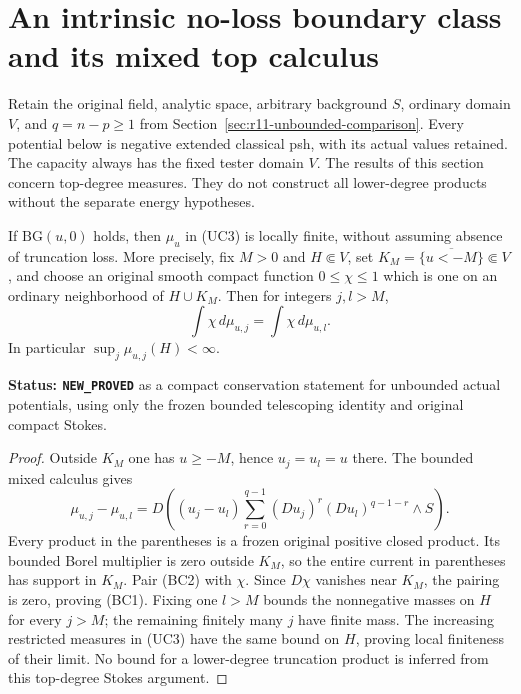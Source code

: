 \section{An intrinsic no-loss boundary class and its mixed top calculus}
\label{sec:r11-capacity-tail-boundary-class}

Retain the original field, analytic space, arbitrary background $S$,
ordinary domain $V$, and $q=n-p\geq1$ from
Section~\ref{sec:r11-unbounded-comparison}. Every potential below is
negative extended classical psh, with its actual values retained.
The capacity always has the fixed tester domain $V$. The results
of this section concern top-degree measures. They do not construct
all lower-degree products without the separate energy hypotheses.

\begin{lemma}
\label{lem:r11-compact-truncation-conservation}
If $\mathrm{BG}(u,0)$ holds, then $\mu_u$ in (UC3) is locally
finite, without assuming absence of truncation loss. More precisely,
fix $M>0$ and $H\Subset V$, set
$K_M=\overline{\{u<-M\}}\Subset V$, and choose an original smooth
compact function $0\leq\chi\leq1$ which is one on an ordinary
neighborhood of $H\cup K_M$. Then for integers $j,l>M$,
\[
                       \int\chi\,d\mu_{u,j}
                           =\int\chi\,d\mu_{u,l}.
 \tag{BC1}
\]
In particular $\sup_j\mu_{u,j}(H)<\infty$.
\end{lemma}

\noindent\textbf{Status: \texttt{NEW\_PROVED}} as a compact
conservation statement for unbounded actual potentials, using only
the frozen bounded telescoping identity and original compact Stokes.

\begin{proof}
Outside $K_M$ one has $u\geq-M$, hence $u_j=u_l=u$ there.
The bounded mixed calculus gives
\[
 \mu_{u,j}-\mu_{u,l}
   =D\left((u_j-u_l)
       \sum_{r=0}^{q-1}(Du_j)^r(Du_l)^{q-1-r}\wedge S\right).
 \tag{BC2}
\]
Every product in the parentheses is a frozen original positive
closed product. Its bounded Borel multiplier is zero outside
$K_M$, so the entire current in parentheses has support in $K_M$.
Pair (BC2) with $\chi$. Since $D\chi$ vanishes near $K_M$,
the pairing is zero, proving (BC1). Fixing one $l>M$ bounds
the nonnegative masses on $H$ for every $j>M$; the remaining
finitely many $j$ have finite mass. The increasing restricted
measures in (UC3) have the same bound on $H$, proving local
finiteness of their limit. No bound for a lower-degree truncation
product is inferred from this top-degree Stokes argument.
\end{proof}

